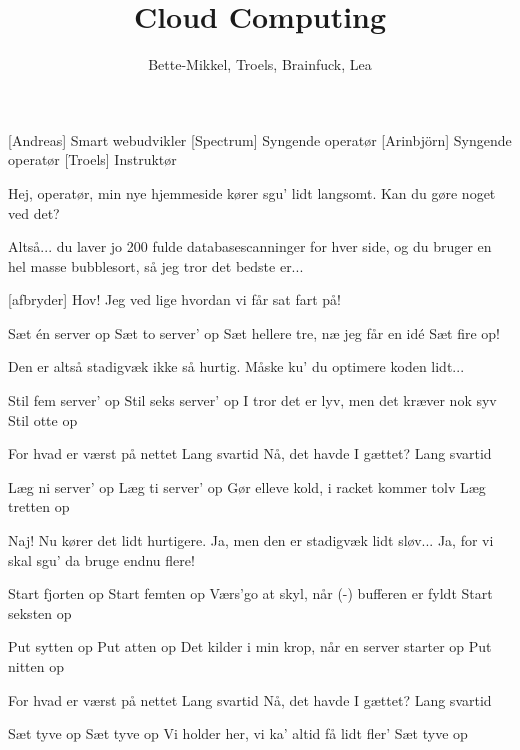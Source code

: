 \documentclass[a4paper,11pt]{article}
\title{Cloud Computing}
\author{Bette-Mikkel, Troels, Brainfuck, Lea}
\begin{document}
\maketitle

\begin{roles}
[Andreas] Smart webudvikler
[Spectrum] Syngende operatør
[Arinbjörn] Syngende operatør
[Troels] Instruktør
\end{roles}

\begin{sketch}
   Hej, operatør, min nye hjemmeside kører sgu' lidt langsomt.
  Kan du gøre noget ved det?

   Altså... du laver jo 200 fulde databasescanninger for hver
  side, og du bruger en hel masse bubblesort, så jeg tror det bedste
  er...

  [afbryder] Hov!  Jeg ved lige hvordan vi får sat fart på!

\end{sketch}

\begin{song}
Sæt én server op
Sæt to server' op
Sæt hellere tre, næ jeg får en idé
Sæt fire op!
\end{song}

\begin{sketch}

 Den er altså stadigvæk ikke så hurtig.
 Måske ku' du optimere koden lidt...
\end{sketch}

\begin{song}
Stil fem server' op
Stil seks server' op
I tror det er lyv, men det kræver nok syv
Stil otte op

 For hvad er værst på nettet
 Lang svartid
 Nå, det havde I gættet?
 Lang svartid

Læg ni server' op
Læg ti server' op
Gør elleve kold, i racket kommer tolv
Læg tretten op
\end{song}

\begin{sketch}

 Naj!  Nu kører det lidt hurtigere.
 Ja, men den er stadigvæk lidt sløv...
 Ja, for vi skal sgu' da bruge endnu flere!
\end{sketch}

\begin{song}
Start fjorten op
Start femten op
Værs'go at skyl, når (-) bufferen er fyldt
Start seksten op

Put sytten op
Put atten op
Det kilder i min krop, når en server starter op
Put nitten op

For hvad er værst på nettet
Lang svartid
Nå, det havde I gættet?
Lang svartid

Sæt tyve op
Sæt tyve op
Vi holder her, vi ka' altid få lidt fler'
Sæt tyve op
\end{song}
\end{document}
